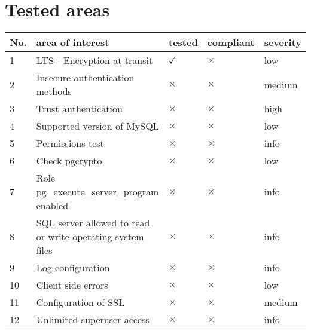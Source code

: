 
        \section{Tested areas}
        \begin{center}
        \begin{tabular}{ | m{1cm} | m{15em} | m{1.5cm} | m{1.7cm} | m{1.5cm}|}
            \hline
            \textbf{No.} & \textbf{area of interest} & \textbf{tested} & \textbf{compliant} &\textbf{severity}\\
            \hline
            1 & LTS - Encryption at transit & $\checkmark$ & $\times$ & low \\\hline
    2 & Insecure authentication methods & $\times$ & $\times$ & medium \\\hline
    3 & Trust authentication & $\times$ & $\times$ & high \\\hline
    4 & Supported version of MySQL & $\times$ & $\times$ & low \\\hline
    5 & Permissions test & $\times$ & $\times$ & info \\\hline
    6 & Check pgcrypto & $\times$ & $\times$ & low \\\hline
    7 & Role pg\_execute\_server\_program enabled & $\times$ & $\times$ & info \\\hline
    8 & SQL server allowed to read or write operating system files & $\times$ & $\times$ & info \\\hline
    9 & Log configuration & $\times$ & $\times$ & info \\\hline
    10 & Client side errors & $\times$ & $\times$ & low \\\hline
    11 & Configuration of SSL & $\times$ & $\times$ & medium \\\hline
    12 & Unlimited superuser access & $\times$ & $\times$ & info \\\hline

        \end{tabular}
        \end{center}
        
